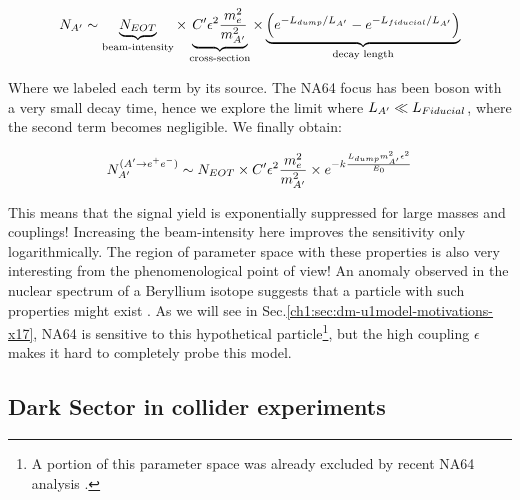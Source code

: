 \begin{equation}
  \label{eq:dm-rate-vis}
    N_{A'} \sim \underbrace{N_{EOT}}_{\textrm{beam-intensity}} \times \underbrace{C' \epsilon^2 \frac{m_e^2}{m^2_{A'}}}_{\textrm{cross-section}} \times \underbrace{\left(e^{- L_{dump}/L_{A'}} - e^{-L_{fiducial}/L_{A'}}\right)}_{\textrm{decay length}}
  \end{equation}

  Where we labeled each term by its source. The NA64 focus has been boson with a very small decay time, hence we explore the limit where $L_{A'} \ll L_{Fiducial}$, where the second term becomes negligible. We finally obtain:

  \begin{equation}
    \label{eq:dm-rate-vis-limit}
    N_{A'}^{(A' \to e^+e^-)} \sim N_{EOT} \times C' \epsilon^2 \frac{m_e^2}{m^2_{A'}} \times e^{-k\frac{L_{dump} m^2_{A'}\epsilon^2}{E_0}}
  \end{equation}

  This means that the signal yield is exponentially suppressed for large masses and couplings! Increasing the beam-intensity here improves the sensitivity only logarithmically. The region of parameter space with these properties is also very interesting from the phenomenological point of view! An anomaly observed in the nuclear spectrum of a Beryllium isotope suggests that a particle with such properties might exist \cite{Krasznahorkay:2015iga}. As we will see in Sec.\ref{ch1:sec:dm-u1model-motivations-x17}, NA64 is sensitive to this hypothetical particle\footnote{A portion of this parameter space was already excluded by recent NA64 analysis \cite{Banerjee:2019hmi,Banerjee:2018vgk}.}, but the high coupling $\epsilon$ makes it hard to completely probe this model.

  \subsection{Dark Sector in collider experiments}

